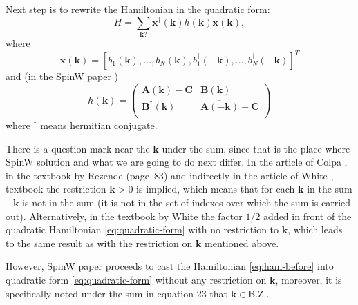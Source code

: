 \documentclass[a4paper,12pt]{article}
\begin{document}
        Next step is to rewrite the Hamiltonian in the quadratic form:
        \begin{equation}
            H = \sum_{\boldsymbol{k} ?} \boldsymbol{x}^{\dag}(\boldsymbol{k})h(\boldsymbol{k})\boldsymbol{x}(\boldsymbol{k}), \label{eq:quadratic-form}
        \end{equation}
        where
        \begin{equation}
            \boldsymbol{x}(\boldsymbol{k}) = \left[b_1(\boldsymbol{k}), \dots, b_N(\boldsymbol{k}), 
            b^{\dag}_1(-\boldsymbol{k}), \dots, b^{\dag}_N(-\boldsymbol{k})\right]^T
        \end{equation}
        and (in the SpinW paper \cite{toth2015linear})
        \begin{equation}
            h(\boldsymbol{k}) = 
            \begin{pmatrix}
                \boldsymbol{A}(\boldsymbol{k}) - \boldsymbol{C} & \boldsymbol{B}(\boldsymbol{k}) \\
                \boldsymbol{B}^{\dag}(\boldsymbol{k}) &\overline{\boldsymbol{A}(-\boldsymbol{k})} - \boldsymbol{C} \\
            \end{pmatrix} \label{eq:h-spinw}
        \end{equation}
        where $^{\dag}$ means hermitian conjugate.
        
        There is a question mark near the $\boldsymbol{k}$ under the sum, since that is the place where SpinW solution and what we are going to do next differ.
        In the article of Colpa \cite{colpa1978diagonalization}, in the textbook by Rezende \cite{rezende2020fundamentals} (page~$83$) 
        and indirectly in the article of White \cite{white1965diagonalization}, textbook \cite{jensen1991rare} the restriction $\boldsymbol{k} > 0$ is implied, 
        which means that for each $\boldsymbol{k}$ in the sum $-\boldsymbol{k}$ is not in the sum (it is not in the set of indexes over which the sum is carried out). 
        Alternatively, in the textbook by White \cite{white1983quantum} 
        the factor $1/2$ added in front of the quadratic Hamiltonian \eqref{eq:quadratic-form} with no restriction to $\boldsymbol{k}$, 
        which leads to the same result as with the restriction on $\boldsymbol{k}$ mentioned above.

        However, SpinW paper \cite{toth2015linear} proceeds to cast the Hamiltonian \eqref{eq:ham-before} into quadratic form \eqref{eq:quadratic-form} without any restriction on $\boldsymbol{k}$,
        moreover, it is specifically noted under the sum in equation 23 that $\boldsymbol{k} \in \text{B.Z.}$. 
\end{document}
